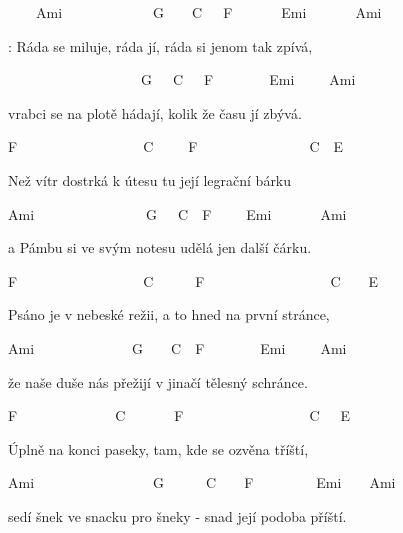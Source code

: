
\begin{chorustext}
~~~~Ami~~~~~~~~~~~~~G~~~~C~~~F~~~~~~~Emi~~~~~~~Ami~~~~~~~

\chorus: Ráda se miluje, ráda jí, ráda si jenom tak zpívá,

~~~~~~~~~~~~~~~~~~~G~~~C~~~F~~~~~~~~Emi~~~~~Ami~~

vrabci se na plotě hádají, kolik že času jí zbývá.

\end{chorustext}

\bigskip

F~~~~~~~~~~~~~~~~~~C~~~~~F~~~~~~~~~~~~~~~~C~~E~

Než vítr dostrká k útesu tu její legrační bárku

Ami~~~~~~~~~~~~~~~~G~~~C~~F~~~~~Emi~~~~~~~Ami~~~

a Pámbu si ve svým notesu udělá jen další čárku.

\bigskip

\chorus

\bigskip

F~~~~~~~~~~~~~~~~~~C~~~~~~F~~~~~~~~~~~~~~~~~~C~~~~E~~

Psáno je v nebeské režii, a to hned na první stránce,

Ami~~~~~~~~~~~~~~G~~~~C~~F~~~~~~~~Emi~~~~~Ami~~~~~~

že naše duše nás přežijí v jinačí tělesný schránce.

\bigskip

\chorus

\bigskip

F~~~~~~~~~~~~~~C~~~~~~~F~~~~~~~~~~~~~~~~~~C~~~E~~

Úplně na konci paseky, tam, kde se ozvěna tříští,

Ami~~~~~~~~~~~~~~~~~G~~~~~~C~~~~F~~~~~~~~~Emi~~~~Ami~~~~

sedí šnek ve snacku pro šneky - snad její podoba příští.

\bigskip

\chorus